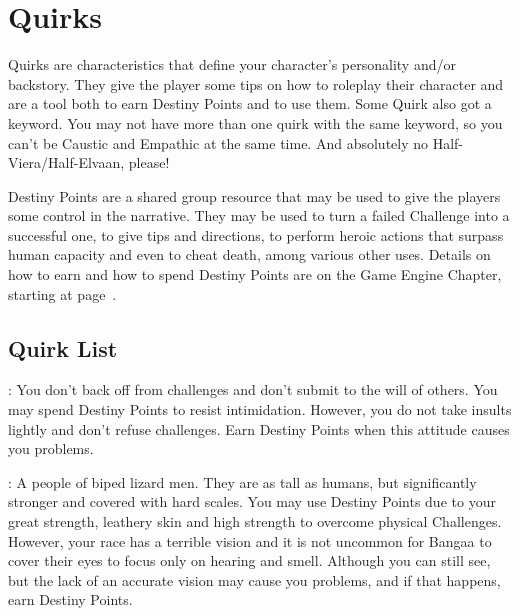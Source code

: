 \section{Quirks}\label{sec:quirks}
\begin{multicols}{2}
\begin{ffcolpage}
Quirks are characteristics that define your character's personality and/or backstory. They give the player some tips on how to roleplay their character and are a tool both to earn Destiny Points and to use them. Some Quirk also got a keyword. You may not have more than one quirk with the same keyword, so you can't be Caustic and Empathic at the same time. And absolutely no Half-Viera/Half-Elvaan, please! \pc

Destiny Points are a shared group resource that may be used to give the players some control in the narrative. They may be used to turn a failed Challenge into a successful one, to give tips and directions, to perform heroic actions that surpass human capacity and even to cheat death, among various other uses. Details on how to earn and how to spend Destiny Points are on the Game Engine Chapter, starting at page~\pageref{ch:characters}.
\end{ffcolpage}

\subsection{Quirk List}\label{subsec:quirklist}

\begin{ffcolpage}
: You don’t back off from challenges and don’t submit to the will of others. You may spend Destiny Points to resist intimidation. However, you do not take insults lightly and don’t refuse challenges. Earn Destiny Points when this attitude causes you problems.
\end{ffcolpage} \pw

\noindent{}
\begin{minipage}{.35\textwidth-2\columnsep}
: A people of biped lizard men. They are as tall as humans, but significantly stronger and covered with hard scales. You may use Destiny Points due to your great strength, leathery skin and high strength to overcome physical Challenges. However, your race has a terrible vision and it is not uncommon for Bangaa to cover their eyes to focus only on hearing and smell. Although you can still see, but the lack of an accurate vision may cause you problems, and if that happens, earn Destiny Points.
\end{minipage} \pw


\end{multicols}
